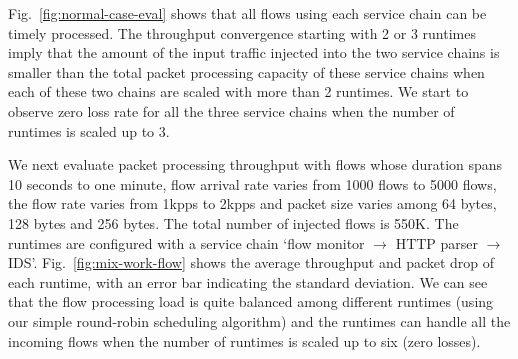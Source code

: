 

Fig.~\ref{fig:normal-case-eval} shows that all flows using each service chain can be timely processed. The throughput convergence starting with 2 or 3 runtimes imply that the amount of the input traffic injected into the two service chains is smaller than the total packet processing capacity of these service chains when each of these two chains are scaled with more than 2 runtimes.%
 We start to observe zero loss rate for all the three service chains when the number of runtimes is scaled up to 3.


 We next evaluate packet processing throughput with flows whose duration spans 10 seconds to one minute, %
 flow arrival rate varies from 1000 flows to 5000 flows,%
 the flow rate varies from 1kpps to 2kpps %
 and packet size varies among 64 bytes, 128 bytes and 256 bytes. The total number of injected flows is 550K.%
 The runtimes are configured with a service chain `flow monitor $\rightarrow$ HTTP parser $\rightarrow$ IDS'. Fig.~\ref{fig:mix-work-flow} shows the average throughput and packet drop of each runtime, with an error bar indicating the standard deviation. We can see that the flow processing load is quite balanced among different runtimes (using our simple round-robin scheduling algorithm) and the runtimes can handle all the incoming flows when the number of runtimes is scaled up to six (zero losses).


